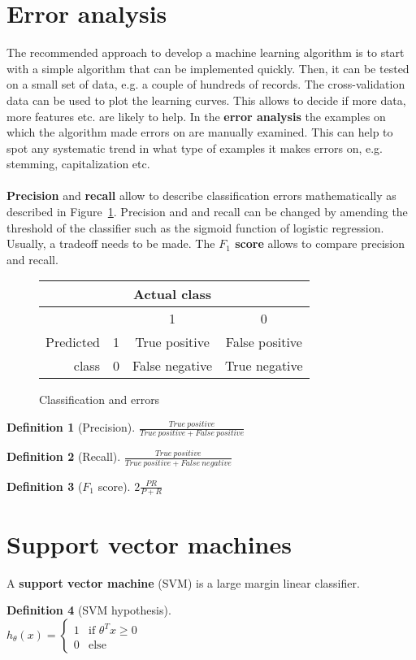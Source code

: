 \documentclass{report}
\newtheorem{definition}{Definition}[section]
\begin{document}
\section{Error analysis}
The recommended approach to develop a machine learning algorithm is to start with a simple algorithm that can be implemented quickly.
Then, it can be tested on a small set of data, e.g. a couple of hundreds of records. The cross-validation data can be used to plot the learning curves.
This allows to decide if more data, more features etc. are likely to help. In the {\bf error analysis} the examples on which the algorithm made errors on are manually examined.
This can help to spot any systematic trend in what type of examples it makes errors on, e.g. stemming, capitalization etc.
\\ \\
{\bf Precision} and {\bf recall} allow to describe classification errors mathematically as described in Figure~\ref{ref:classificationerror}.
Precision and and recall can be changed by amending the threshold of the classifier such as the sigmoid function of logistic regression. Usually, a tradeoff needs to be made. The {\bf $F_1$ score} allows to compare precision and recall.

\begin{figure}[h!]
\centering
\begin{tabular}{r||ccc}
& & Actual class & \\
\hline
\hline
& & 1 & 0 \\
Predicted & 1 & True positive & False positive \\
class & 0 & False negative & True negative \\
\end{tabular}
\caption{Classification and errors}
\label{ref:classificationerror}
\end{figure}


\begin{definition}[Precision]
$\frac{True\:positive}{True\:positive + False\:positive}$
\end{definition}

\begin{definition}[Recall]
$\frac{True\:positive}{True\:positive + False\:negative}$
\end{definition}

\begin{definition}[$F_1$ score]
$2\frac{PR}{P+R}$
\end{definition}

\section{Support vector machines}
A {\bf support vector machine} (SVM) is a large margin linear classifier.
\begin{definition}[SVM hypothesis]~\\
$h_{\theta}(x) =
\left\{
\begin{array}{lll}
1  & \mbox{if } \theta^Tx \ge 0 \\
0  & \mbox{else}
\end{array}
\right.$ \\
\end{definition}
\end{document}

